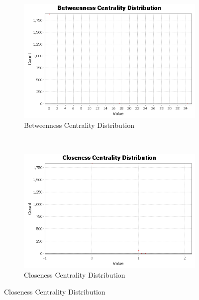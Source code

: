\documentclass[a4paper,12pt]{article}
\begin{document}
\begin{figure}
        \centering
        \begin{subfigure}[a]{0.675\textwidth}
                \includegraphics[width=\textwidth]{BetweennessCentralityDistribution.png}
                \caption{Betweenness Centrality Distribution}
               
        \end{subfigure}
        ~ %
        
        \begin{subfigure}[b]{0.675\textwidth}
                \includegraphics[width=\textwidth]{ClosenessCentralityDistribution.png}
                \caption{Closeness Centrality Distribution}
                
        \end{subfigure}%
        

\end{figure}
\end{document}
